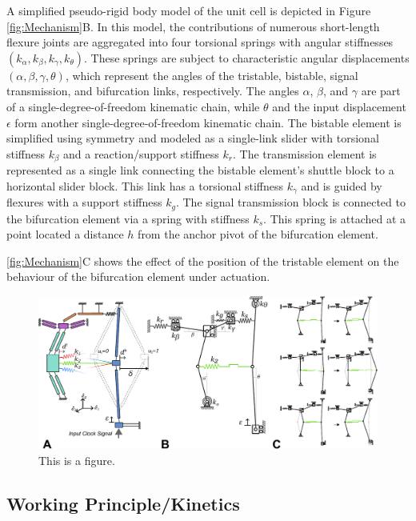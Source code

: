 A simplified pseudo-rigid body model of the unit cell is depicted in Figure \autoref*{fig:Mechanism}B. In this model, the contributions of numerous short-length flexure joints are aggregated into four torsional springs with angular stiffnesses \((k_\alpha, k_\beta, k_\gamma, k_\theta)\). These springs are subject to characteristic angular displacements \((\alpha, \beta, \gamma, \theta)\), which represent the angles of the tristable, bistable, signal transmission, and bifurcation links, respectively. The angles \(\alpha\), \(\beta\), and \(\gamma\) are part of a single-degree-of-freedom kinematic chain, while \(\theta\) and the input displacement \(\epsilon\) form another single-degree-of-freedom kinematic chain.
The bistable element is simplified using symmetry and modeled as a single-link slider with torsional stiffness \( k_\beta \) and a reaction/support stiffness \( k_r \). The transmission element is represented as a single link connecting the bistable element's shuttle block to a horizontal slider block. This link has a torsional stiffness \( k_\gamma \) and is guided by flexures with a support stiffness \( k_g \).
The signal transmission block is connected to the bifurcation element via a spring with stiffness \( k_s \). This spring is attached at a point located a distance \( h \) from the anchor pivot of the bifurcation element.

\autoref*{fig:Mechanism}C shows the effect of the position of the tristable element on the behaviour of the bifurcation element under actuation. 


\begin{figure}[h]
    \centering
    \includegraphics[width=\textwidth]{images/SVGs/PRBM.pdf}
    \caption{This is a figure.}
    \label{fig:Mechanism}
\end{figure}



\subsection*{Working Principle/Kinetics}

